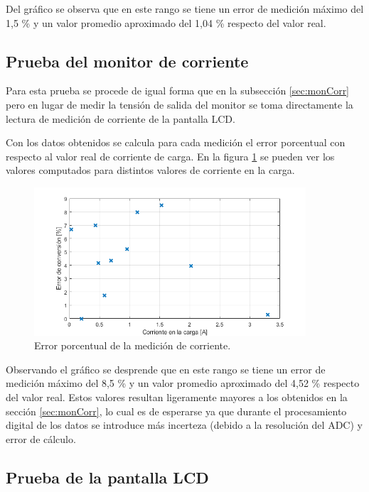 Del gráfico se observa que en este rango se tiene un error de medición máximo del 1,5 \% y un valor promedio aproximado del 1,04 \% respecto del valor real.

\subsection{Prueba del monitor de corriente}

Para esta prueba se procede de igual forma que en la subsección \ref{sec:monCorr} pero en lugar de medir la tensión de salida del monitor se toma directamente la lectura de medición de corriente de la pantalla LCD.

Con los datos obtenidos se calcula para cada medición el error porcentual con respecto al valor real de corriente de carga. En la figura \ref{fig:testMonCorr2} se pueden ver los valores computados para distintos valores de corriente en la carga.

\begin{figure}[H]
\centering
\includegraphics[width=0.9\textwidth]{./Figures/testMonCorr2.png}
\caption{Error porcentual de la medición de corriente.}
\label{fig:testMonCorr2}
\end{figure}

Observando el gráfico se desprende que en este rango se tiene un error de medición máximo del 8,5 \% y un valor promedio aproximado del 4,52 \% respecto del valor real. Estos valores resultan ligeramente mayores a los obtenidos en la sección \ref{sec:monCorr}, lo cual es de esperarse ya que durante el procesamiento digital de los datos se introduce más incerteza (debido a la resolución del ADC) y error de cálculo.

\subsection{Prueba de la pantalla LCD}

